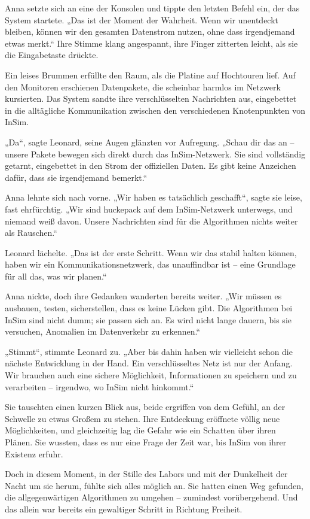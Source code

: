 \documentclass[
]{article}
\begin{document}
Anna setzte sich an eine der Konsolen und tippte den letzten Befehl ein, der das System startete. „Das ist der Moment der Wahrheit. Wenn wir unentdeckt bleiben, können wir den gesamten Datenstrom nutzen, ohne dass irgendjemand etwas merkt.`` Ihre Stimme klang angespannt, ihre Finger zitterten leicht, als sie die Eingabetaste drückte.

Ein leises Brummen erfüllte den Raum, als die Platine auf Hochtouren lief. Auf den Monitoren erschienen Datenpakete, die scheinbar harmlos im Netzwerk kursierten. Das System sandte ihre verschlüsselten Nachrichten aus, eingebettet in die alltägliche Kommunikation zwischen den verschiedenen Knotenpunkten von InSim.

„Da``, sagte Leonard, seine Augen glänzten vor Aufregung. „Schau dir das an -- unsere Pakete bewegen sich direkt durch das InSim-Netzwerk. Sie sind vollständig getarnt, eingebettet in den Strom der offiziellen Daten. Es gibt keine Anzeichen dafür, dass sie irgendjemand bemerkt.``

Anna lehnte sich nach vorne. „Wir haben es tatsächlich geschafft``, sagte sie leise, fast ehrfürchtig. „Wir sind huckepack auf dem InSim-Netzwerk unterwegs, und niemand weiß davon. Unsere Nachrichten sind für die Algorithmen nichts weiter als Rauschen.``

Leonard lächelte. „Das ist der erste Schritt. Wenn wir das stabil halten können, haben wir ein Kommunikationsnetzwerk, das unauffindbar ist -- eine Grundlage für all das, was wir planen.``

Anna nickte, doch ihre Gedanken wanderten bereits weiter. „Wir müssen es ausbauen, testen, sicherstellen, dass es keine Lücken gibt. Die Algorithmen bei InSim sind nicht dumm; sie passen sich an. Es wird nicht lange dauern, bis sie versuchen, Anomalien im Datenverkehr zu erkennen.``

„Stimmt``, stimmte Leonard zu. „Aber bis dahin haben wir vielleicht schon die nächste Entwicklung in der Hand. Ein verschlüsseltes Netz ist nur der Anfang. Wir brauchen auch eine sichere Möglichkeit, Informationen zu speichern und zu verarbeiten -- irgendwo, wo InSim nicht hinkommt.``

Sie tauschten einen kurzen Blick aus, beide ergriffen von dem Gefühl, an der Schwelle zu etwas Großem zu stehen. Ihre Entdeckung eröffnete völlig neue Möglichkeiten, und gleichzeitig lag die Gefahr wie ein Schatten über ihren Plänen. Sie wussten, dass es nur eine Frage der Zeit war, bis InSim von ihrer Existenz erfuhr.

Doch in diesem Moment, in der Stille des Labors und mit der Dunkelheit der Nacht um sie herum, fühlte sich alles möglich an. Sie hatten einen Weg gefunden, die allgegenwärtigen Algorithmen zu umgehen -- zumindest vorübergehend. Und das allein war bereits ein gewaltiger Schritt in Richtung Freiheit.
\end{document}
